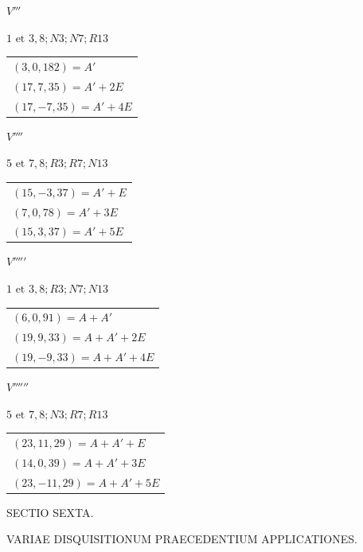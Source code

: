 \begin{center}
\begin{minipage}[t]{0.47\linewidth}\centering
\(V'''\)\par\smallskip
{\small \(1\text{ et }3, 8; N3; N7; R13\)}\par\smallskip
\begin{tabular}{@{}l@{}}
\((3,0,182)=A'\)\\\((17,7,35)=A'+2E\)\\\((17,-7,35)=A'+4E\)
\end{tabular}
\end{minipage}\hfill\begin{minipage}[t]{0.47\linewidth}\centering
\(V''''\)\par\smallskip
{\small \(5\text{ et }7, 8; R3; R7; N13\)}\par\smallskip
\begin{tabular}{@{}l@{}}
\((15,-3,37)=A'+E\)\\\((7,0,78)=A'+3E\)\\\((15,3,37)=A'+5E\)
\end{tabular}
\end{minipage}
\end{center}
\begin{center}
\begin{minipage}[t]{0.47\linewidth}\centering
\(V'''''\)\par\smallskip
{\small \(1\text{ et }3, 8; R3; N7; N13\)}\par\smallskip
\begin{tabular}{@{}l@{}}
\((6,0,91)=A+A'\)\\\((19,9,33)=A+A'+2E\)\\\((19,-9,33)=A+A'+4E\)
\end{tabular}
\end{minipage}\hfill\begin{minipage}[t]{0.47\linewidth}\centering
\(V''''''\)\par\smallskip
{\small \(5\text{ et }7, 8; N3; R7; R13\)}\par\smallskip
\begin{tabular}{@{}l@{}}
\((23,11,29)=A+A'+E\)\\\((14,0,39)=A+A'+3E\)\\\((23,-11,29)=A+A'+5E\)
\end{tabular}
\end{minipage}
\end{center}
\clearpage{}
\begin{center}\Large SECTIO SEXTA.\par\medskip\normalsize VARIAE DISQUISITIONUM PRAECEDENTIUM APPLICATIONES.\end{center}

